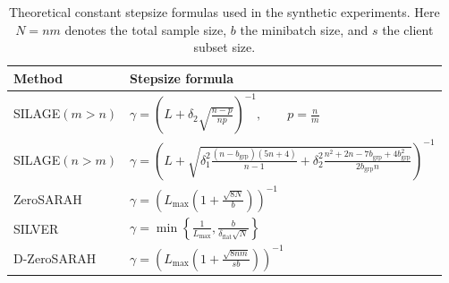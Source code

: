 \documentclass{article}
\newcommand{\rb}[1]{\left(#1\right)}
\theoremstyle{plain}
\newcommand{\algname}[1]{{\sf\scalefont{0.88}\color{mydarkgreen}#1}\xspace}
\def\algname#1{#1}%
\begin{document}
\begin{table}[t]
\centering
\small
\setlength{\tabcolsep}{5pt}
\caption{Theoretical constant stepsize formulas used in the synthetic experiments. Here $N=nm$ denotes the total sample size, $b$ the minibatch size, and $s$ the client subset size.}
\label{tab:stepsize-formulas}
\begin{tabular}{ll}
\toprule
\textbf{Method} & \textbf{Stepsize formula} \\
\midrule
\algname{SILAGE}$(m>n)$ &
$\gamma = \rb{L + \delta_2 \sqrt{\frac{n-p}{np}}}^{-1}, \qquad p=\frac{n}{m}$ \\[0.75em]

\algname{SILAGE}$(n>m)$ &
$\gamma = \rb{L + \sqrt{\delta_1^2 \frac{(n-b_{\mathrm{grp}})(5n+4)}{n-1}
+ \delta_2^2 \frac{n^2+2n-7b_{\mathrm{grp}}+4b_{\mathrm{grp}}^2}{2b_{\mathrm{grp}}n}}}^{-1}$ \\[0.75em]

\algname{ZeroSARAH} &
$\gamma = \rb{L_{\max}\rb{1+\frac{\sqrt{8N}}{b}}}^{-1}$ \\[0.75em]

\algname{SILVER} &
$\gamma = \min\!\left\{\frac{1}{L_{\max}}, \frac{b}{\delta_{\mathrm{flat}}\sqrt{N}}\right\}$ \\[0.75em]

\algname{D-ZeroSARAH} &
$\gamma = \rb{L_{\max}\rb{1+\frac{\sqrt{8nm}}{sb}}}^{-1}$ \\
\bottomrule
\end{tabular}
\end{table}
\end{document}
